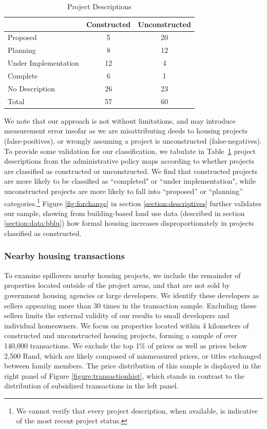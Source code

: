 \documentclass[12pt]{article}
\begin{document}
\begin{table}[h!]
\centering
\caption{Project Descriptions}\label{table:projectdescriptions}
\vspace{-2mm}
\begin{tabular}{l*{1}{cc}}
\toprule
 &Constructed &Unconstructed  \\
\midrule
Proposed   &          5  &    20  \\
Planning   &          8  &    12  \\
Under Implementation& 12 &     4  \\
Complete   &          6  &     1  \\
No Description &     26  &    23  \\ 
Total             &  57  &    60  \\
\bottomrule
\end{tabular}
\end{table}

We note that our approach is not without limitations, and may introduce measurement error insofar as we are misattributing deeds to housing projects (false-positives), or wrongly assuming a project is unconstructed (false-negatives). To provide some validation for our classification, we tabulate in Table~\ref{table:projectdescriptions} project descriptions from the administrative policy maps according to whether projects are classified as constructed or unconstructed. We find that constructed projects are more likely to be classified as ``completed" or ``under implementation", while unconstructed projects are more likely to fall into ``proposed'' or ``planning'' categories.\footnote{We cannot verify that every project description, when available, is indicative of the most recent project status.} Figure \ref{fig:forchange} in section \ref{section:descriptives} further validates our sample, showing from building-based land use data (described in section \ref{section:data:bblu}) how formal housing increases disproportionately in projects classified as constructed. 


\subsubsection*{Nearby housing transactions}

To examine spillovers nearby housing projects, we include the remainder of properties located outside of the project areas, and that are not sold by government housing agencies or large developers.  We identify these developers as sellers appearing more than 30 times in the transaction sample.  Excluding these sellers limits the external validity of our results to small developers and individual homeowners.  We focus on properties located within 4 kilometers of constructed and unconstructed housing projects, forming a sample of over 140,000 transactions.  We exclude the top 1\% of prices as well as prices below 2,500 Rand, which are likely composed of mismeasured prices, or titles exchanged between family members. The price distribution of this sample is displayed in the right panel of Figure \ref{figure:transactionhist}, which stands in contrast to the distribution of subsidized transactions in the left panel. 
\end{document}
